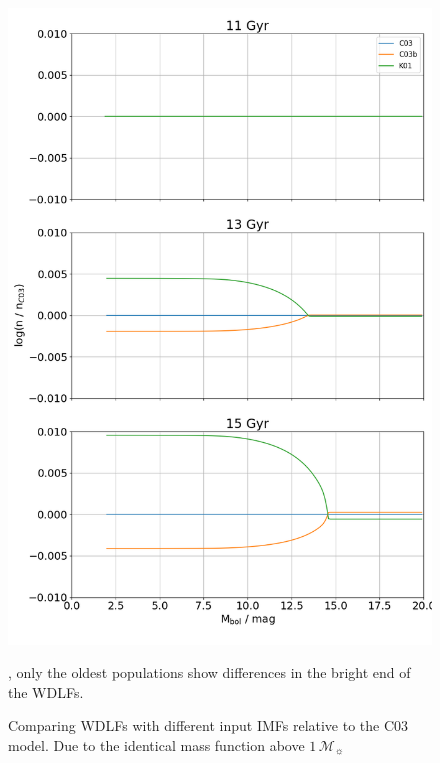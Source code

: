 \documentclass[fleqn,usenatbib]{rasti}
\newcommand{\msun}{\mathcal{M}_{\sun}}
\begin{document}
\begin{figure}
    \centering
    \includegraphics[width=\columnwidth]{wdlf_compare_imf.png}
    \caption{Comparing WDLFs with different input IMFs relative to the C03
    model. Due to the identical mass function above $1\,\msun$}, only the
    oldest populations show differences in the bright end of the WDLFs.
    \label{fig:wdlf_compare_imf}
\end{figure}
\end{document}
